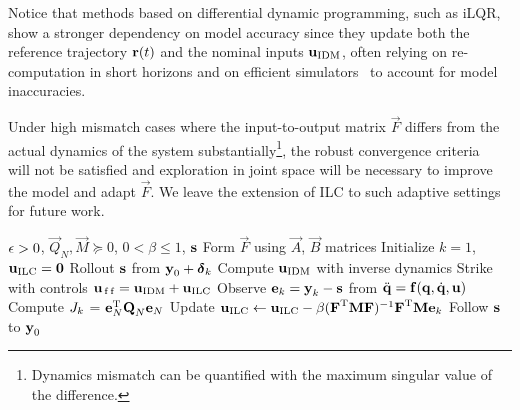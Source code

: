 Notice that methods based on differential dynamic programming, such as iLQR, show a stronger dependency on model accuracy since they update both the reference trajectory $\boldsymbol{\mathrm{r}}(t)$ and the nominal inputs $\boldsymbol{\mathrm{u}}_{\mathrm{IDM}}$, often relying on re-computation in short horizons and on efficient simulators~\cite{Tassa08} to account for model inaccuracies. 

Under high mismatch cases where the input-to-output matrix $\vec{F}$ differs from the actual dynamics of the system substantially\footnote{Dynamics mismatch can be quantified with the maximum singular value of the difference.}, the robust convergence criteria~\cite{Bristow06} will not be satisfied and exploration in joint space will be necessary to improve the model and adapt $\vec{F}$. We leave the extension of ILC to such adaptive settings for future work.

\begin{algorithm}[tb]
   \caption{\alg}
   \label{alg1}
\begin{algorithmic}
    $\epsilon > 0$, $\vec{Q}_N, \vec{M} \succeq 0$, $0 < \beta \leq 1$, $\boldsymbol{\mathrm{s}}$ 
   \STATE Form $\vec{F}$ using $\vec{A}$, $\vec{B}$ matrices
   \STATE Initialize $k = 1$, $\boldsymbol{\mathrm{u}}_{\mathrm{ILC}} = \boldsymbol{\mathrm{0}}$
   \REPEAT 
   	   \STATE Rollout $\boldsymbol{\mathrm{s}}$ from $\boldsymbol{\mathrm{y}}_0 + \boldsymbol{\mathrm{\delta}}_k$ 
   	   \STATE Compute $\boldsymbol{\mathrm{u}}_{\mathrm{IDM}}$ with inverse dynamics
 	   \STATE Strike with controls $\boldsymbol{\mathrm{u}}_{\mathrm{\,f\,f}} = \boldsymbol{\mathrm{u}}_{\mathrm{IDM}} + \boldsymbol{\mathrm{u}}_{\mathrm{ILC}}$  %
 	   \STATE Observe $\boldsymbol{\mathrm{e}}_k = \boldsymbol{\mathrm{y}}_k - \boldsymbol{\mathrm{s}}$ from $\ddot{\boldsymbol{\mathrm{q}}} = \boldsymbol{\mathrm{f}}(\boldsymbol{\mathrm{q}},\dot{\boldsymbol{\mathrm{q}}},\boldsymbol{\mathrm{u}})$
 	   \STATE Compute $J_k$ = $\boldsymbol{\mathrm{e}}_N^{\mathrm{T}}\boldsymbol{\mathrm{Q}}_{N}\boldsymbol{\mathrm{e}}_N$
 	   \STATE Update $\boldsymbol{\mathrm{u}}_{\mathrm{ILC}} \leftarrow \boldsymbol{\mathrm{u}}_{\mathrm{ILC}} - \beta (\boldsymbol{\mathrm{F}}^{\mathrm{T}}\boldsymbol{\mathrm{M}}\boldsymbol{\mathrm{F}})^{-1}\boldsymbol{\mathrm{F}}^{\mathrm{T}}\boldsymbol{\mathrm{M}}\boldsymbol{\mathrm{e}}_k$
 	   \STATE Follow $\boldsymbol{\mathrm{s}}$ to $\boldsymbol{\mathrm{y}}_0$
\end{algorithmic}
\end{algorithm}